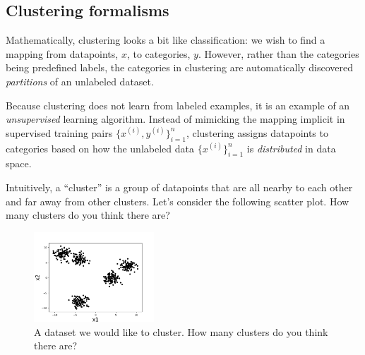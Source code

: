 \subsection{Clustering formalisms}




Mathematically, clustering looks a bit like classification: we wish to
find a mapping from datapoints, $x$, to categories, $y$. However,
rather than the categories being predefined labels, the categories in
clustering are automatically discovered \textit{partitions} of an
unlabeled dataset.

Because clustering does not learn from labeled examples, it is an
example of an \textit{unsupervised} learning algorithm. Instead of
mimicking the mapping implicit in supervised training pairs
$\{x^{(i)},y^{(i)}\}_{i=1}^n$, clustering assigns datapoints to
categories based on how the unlabeled data $\{x^{(i)}\}_{i=1}^n$ is
\textit{distributed} in data space.



Intuitively, a ``cluster'' is a group of datapoints that are all
nearby to each other and far away from other clusters. Let's consider
the following scatter plot. How many clusters do you think there are?

\begin{figure}[h]
  \centering
  \includegraphics[width=0.40\textwidth]{figures/kmeans_fig1.png}
  \caption{A dataset we would like to cluster. How many clusters do you think there are?}
  \label{fig:kmeans_fig1}
\end{figure}

